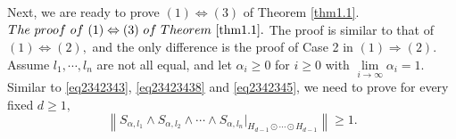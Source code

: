 \documentclass[11pt]{article}
\theoremstyle{plain}
\theoremstyle{definition}
\begin{document}
{Next, we are ready to  prove $(1)\Leftrightarrow (3)$ of Theorem \ref{thm1.1}.\\
$The~ proof ~of~ (1)\Leftrightarrow (3) ~of ~Theorem~ \ref{thm1.1}.$
	The proof is similar to that of $(1)\Leftrightarrow (2),$ and the only difference is the proof of Case 2 in $(1)\Rightarrow(2)$.
Assume $l_1,\cdots,l_n$ are not all equal, and let $\alpha_i \geq 0$ for $i\geq 0$ with $\lim\limits_{i\rightarrow \infty}\alpha_i=1.$ 
Similar to \eqref{eq2342343}, \eqref{eq23423438} and \eqref{eq2342345},
we need to prove for every fixed $d\geq 1,$ 
\begin{equation}\label{eqA20case}\left \|  S_{{\alpha,l_{1}}}\wedge S_{{\alpha},l_{2}}\wedge \cdots \wedge S_{{\alpha,l_{n}}}|_{H_{d-1}\odot \cdots \odot H_{d-1}}  \right \|  \ge 1.\end{equation}
			
}
\end{document}
